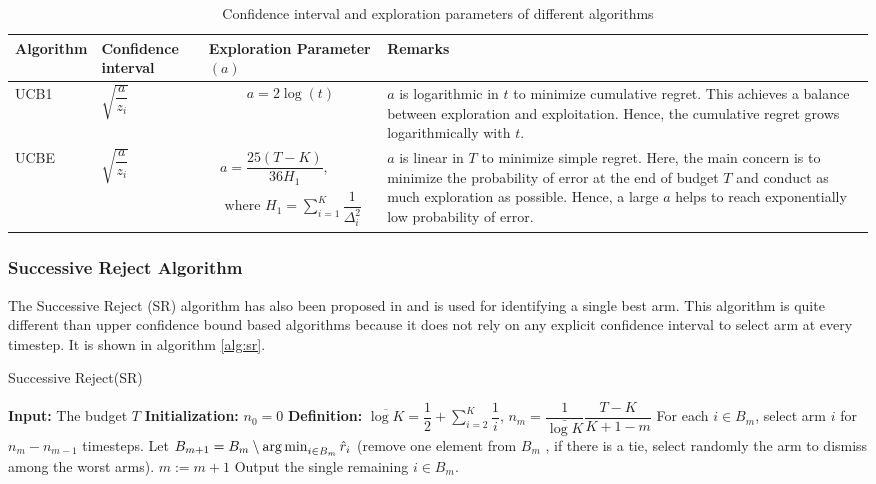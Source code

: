 \begin{table}
\caption{Confidence interval and exploration parameters of different algorithms}
\label{table:comp-exp}
\begin{center}
\begin{tabular}{|p{5em}|p{6em}|p{8em}|p{12em}|}
\hline
Algorithm  &  Confidence interval & Exploration Parameter$(a)$ & Remarks \\
\hline
\hline
UCB1       & $\sqrt{\dfrac{a}{z_i}}$ & \begin{align*}a = 2\log (t)\end{align*} & $a$ is logarithmic in $t$ to minimize cumulative regret. This achieves a balance between exploration and exploitation. Hence, the cumulative regret grows logarithmically with $t$. \\%
\hline
\hline
UCBE       & $\sqrt{\dfrac{a}{z_i}}$ & \begin{align*}a = \dfrac{25(T-K)}{36 H_1},\\ \text{ where }H_1 = \sum_{i=1}^{K}\dfrac{1}{\Delta_i^2}\end{align*} & $a$ is linear in $T$ to minimize simple regret. Here, the main concern is to minimize the probability of error at the end of budget $T$ and conduct as much exploration as possible. Hence, a large $a$ helps to reach exponentially low probability of error.\\\midrule
\end{tabular}
\end{center}
\end{table}


\subsubsection{Successive Reject Algorithm}

The Successive Reject (SR) algorithm has also been proposed in \citet{audibert2010best} and is used for identifying a single best arm. This algorithm is quite different than upper confidence bound based algorithms because it does not rely on any explicit confidence interval to select arm at every timestep. It is shown in algorithm \ref{alg:sr}.


\begin{algorithm}[!th]
\caption{Successive Reject(SR)}
\label{alg:sr}
\begin{algorithmic}[1]
\State \textbf{Input: } The budget $T$
\State \textbf{Initialization: } $n_0 = 0$
\State \textbf{Definition: } $\overline{\log K} = \dfrac{1}{2} + \sum_{i=2}^{K}\dfrac{1}{i}$, $n_m = \dfrac{1}{\bar{\log K}}\dfrac{T-K}{K + 1 - m}$
\State For each $i \in B_{m}$, select arm $i$ for $n_m - n_{m-1}$ timesteps.
\State Let $B_{m+1} = B_m\setminus \operatorname*{arg\,min}_{i\in B_m} \hat{r}_i$
(remove one element from $B_m$ , if there
is a tie, select randomly the arm to dismiss among the worst arms).
\State $m:=m+1 $
\EndFor
\State Output the single remaining $i\in B_{m}$.
\end{algorithmic}
\end{algorithm}


